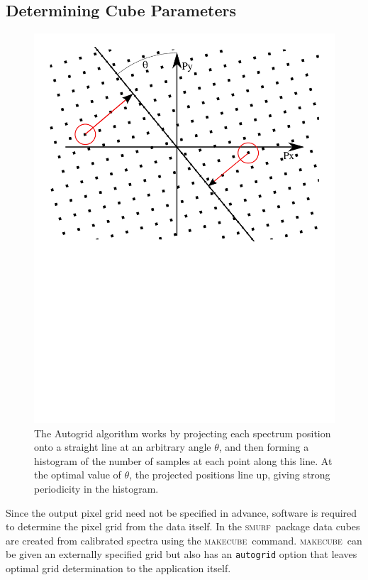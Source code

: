 \documentclass[a4paper,fleqn,usenatbib]{mnras}
\newcommand{\smurf}{\textsc{smurf}}
\newcommand{\makecube}{\textsc{makecube}}
\begin{document}
\subsection{Determining Cube Parameters}
\label{sec:makecube}

\begin{figure}
\includegraphics[width=\columnwidth]{autogrid}
\caption{The Autogrid algorithm works by projecting each spectrum
  position onto a straight line at an arbitrary angle $\theta$, and then
  forming a histogram of the number of samples at each point along
  this line. At the optimal value of $\theta$, the projected positions
  line up, giving strong periodicity in the histogram.}
\label{fig:autogrid}
\end{figure}

Since the output pixel grid need not be specified in advance, software
is required to determine the pixel grid from the data itself. In the
\smurf\ package data cubes are created from calibrated spectra using the
\makecube\ command. \makecube\ can be given an externally specified
grid but also has an \texttt{autogrid} option that leaves optimal grid
determination to the application itself.
\end{document}
